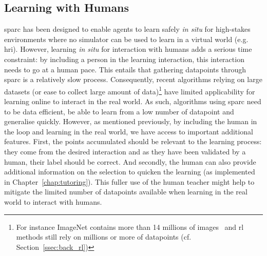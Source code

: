 \subsection{Learning with Humans}


\gls{sparc} has been designed to enable agents to learn safely \textit{in situ} for high-stakes environments where no simulator can be used to learn in a virtual world (e.g. \gls{hri}). However, learning \textit{in situ} for interaction with humans adds a serious time constraint: by including a person in the learning interaction, this interaction needs to go at a human pace. This entails that gathering datapoints through \gls{sparc} is a relatively slow process. 
Consequently, recent algorithms relying on large datasets (or ease to collect large amount of data)\footnote{For instance ImageNet contains more than 14 millions of images~\citep{russakovsky2015imagenet} and \gls{rl} methods still rely on millions or more of datapoints (cf. Section~\ref{ssec:back_rl})} have limited applicability for learning online to interact in the real world. 
As such, algorithms using \gls{sparc} need to be data efficient, be able to learn from a low number of datapoint and generalise quickly. However, as mentioned previously, by including the human in the loop and learning in the real world, we have access to important additional features. First, the points accumulated should be relevant to the learning process: they come from the desired interaction and as they have been validated by a human, their label should be correct. And secondly, the human can also provide additional information on the selection to quicken the learning (as implemented in Chapter~\ref{chap:tutoring}). This fuller use of the human teacher might help to mitigate the limited number of datapoints available when learning in the real world to interact with humans.


